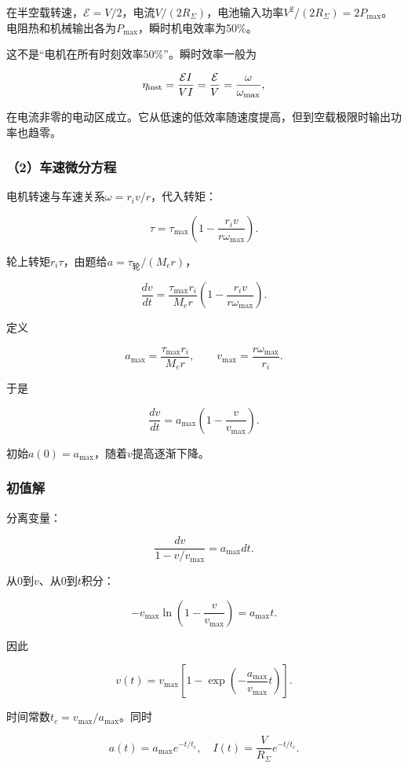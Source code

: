 \documentclass[12pt,a4paper,fontset=fandol]{ctexart}
\begin{document}
在半空载转速，\(\mathcal E=V/2\)，电流\(V/(2R_\Sigma)\)，电池输入功率\(V^2/(2R_\Sigma)=2P_{\max}\)。电阻热和机械输出各为\(P_{\max}\)，瞬时机电效率为50\%。

这不是``电机在所有时刻效率50\%''。瞬时效率一般为

\[
\eta_{\rm inst}=\frac{\mathcal EI}{VI}
=\frac{\mathcal E}{V}
=\frac\omega{\omega_{\max}},
\]

在电流非零的电动区成立。它从低速的低效率随速度提高，但到空载极限时输出功率也趋零。

\subsubsection{（2）车速微分方程}\label{ux8f66ux901fux5faeux5206ux65b9ux7a0b}

电机转速与车速关系\(\omega=r_iv/r\)，代入转矩：

\[
\tau=\tau_{\max}
\left(1-\frac{r_iv}{r\omega_{\max}}\right).
\]

轮上转矩\(r_i\tau\)，由题给\(a=\tau_{\text{轮}}/(M_er)\)，

\[
\frac{dv}{dt}
=\frac{\tau_{\max}r_i}{M_er}
\left(1-\frac{r_iv}{r\omega_{\max}}\right).
\]

定义

\[
\boxed{a_{\max}=\frac{\tau_{\max}r_i}{M_er}},
\qquad
\boxed{v_{\max}=\frac{r\omega_{\max}}{r_i}}.
\]

于是

\[
\frac{dv}{dt}=a_{\max}\left(1-\frac v{v_{\max}}\right).
\]

初始\(a(0)=a_{\max}\)，随着\(v\)提高逐渐下降。

\subsubsection{初值解}\label{ux521dux503cux89e3}

分离变量：

\[
\frac{dv}{1-v/v_{\max}}=a_{\max}dt.
\]

从0到\(v\)、从0到\(t\)积分：

\[
-v_{\max}\ln\left(1-\frac v{v_{\max}}\right)
=a_{\max}t.
\]

因此

\[
\boxed{
v(t)=v_{\max}
\left[1-\exp\left(-\frac{a_{\max}}{v_{\max}}t\right)\right]}.
\]

时间常数\(t_c=v_{\max}/a_{\max}\)。同时

\[
a(t)=a_{\max}e^{-t/t_c},\quad
I(t)=\frac V{R_\Sigma}e^{-t/t_c}.
\]
\end{document}
